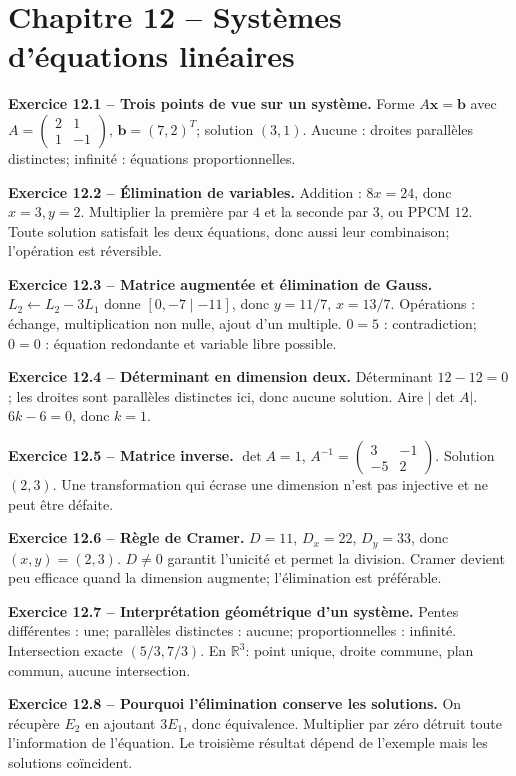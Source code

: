 \documentclass[11pt,a4paper,openany]{book}
\newcommand{\R}{\mathbb{R}}\newcommand{\N}{\mathbb{N}}\newcommand{\Z}{\mathbb{Z}}\newcommand{\Q}{\mathbb{Q}}
\begin{document}
\chapter*{Chapitre 12 -- Systèmes d'équations linéaires}
\begin{answerbox}
\textbf{Exercice 12.1 -- Trois points de vue sur un système.} Forme $A\mathbf x=\mathbf b$ avec $A=\begin{pmatrix}2&1\\1&-1\end{pmatrix}$, $\mathbf b=(7,2)^T$; solution $(3,1)$. Aucune : droites parallèles distinctes; infinité : équations proportionnelles.\par
\textbf{Exercice 12.2 -- Élimination de variables.} Addition : $8x=24$, donc $x=3,y=2$. Multiplier la première par $4$ et la seconde par $3$, ou PPCM $12$. Toute solution satisfait les deux équations, donc aussi leur combinaison; l'opération est réversible.\par
\textbf{Exercice 12.3 -- Matrice augmentée et élimination de Gauss.} $L_2\leftarrow L_2-3L_1$ donne $[0,-7\mid-11]$, donc $y=11/7$, $x=13/7$. Opérations : échange, multiplication non nulle, ajout d'un multiple. $0=5$ : contradiction; $0=0$ : équation redondante et variable libre possible.\par
\textbf{Exercice 12.4 -- Déterminant en dimension deux.} Déterminant $12-12=0$; les droites sont parallèles distinctes ici, donc aucune solution. Aire $|\det A|$. $6k-6=0$, donc $k=1$.\par
\textbf{Exercice 12.5 -- Matrice inverse.} $\det A=1$, $A^{-1}=\begin{pmatrix}3&-1\\-5&2\end{pmatrix}$. Solution $(2,3)$. Une transformation qui écrase une dimension n'est pas injective et ne peut être défaite.\par
\textbf{Exercice 12.6 -- Règle de Cramer.} $D=11$, $D_x=22$, $D_y=33$, donc $(x,y)=(2,3)$. $D\neq0$ garantit l'unicité et permet la division. Cramer devient peu efficace quand la dimension augmente; l'élimination est préférable.\par
\textbf{Exercice 12.7 -- Interprétation géométrique d'un système.} Pentes différentes : une; parallèles distinctes : aucune; proportionnelles : infinité. Intersection exacte $(5/3,7/3)$. En $\R^3$: point unique, droite commune, plan commun, aucune intersection.\par
\textbf{Exercice 12.8 -- Pourquoi l'élimination conserve les solutions.} On récupère $E_2$ en ajoutant $3E_1$, donc équivalence. Multiplier par zéro détruit toute l'information de l'équation. Le troisième résultat dépend de l'exemple mais les solutions coïncident.\par

\end{answerbox}
\end{document}

